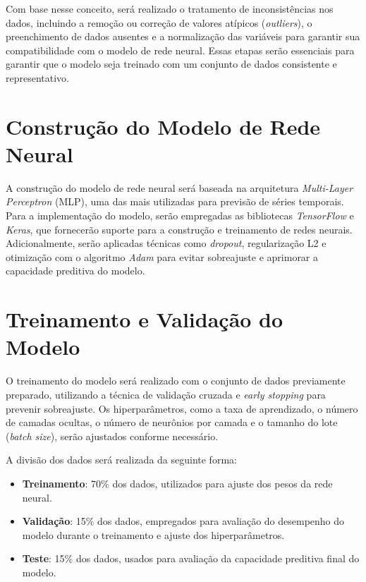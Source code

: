     Com base nesse conceito, será realizado o tratamento de inconsistências nos dados, incluindo a remoção 
    ou correção de valores atípicos (\emph{outliers}), o preenchimento de dados ausentes e a normalização das 
    variáveis para garantir sua compatibilidade com o modelo de rede neural. Essas etapas serão essenciais 
    para garantir que o modelo seja treinado com um conjunto de dados consistente e representativo.

\section{Construção do Modelo de Rede Neural}

    A construção do modelo de rede neural será baseada na arquitetura \emph{Multi-Layer Perceptron} (MLP), 
    uma das mais utilizadas para previsão de séries temporais. Para a implementação do modelo, serão 
    empregadas as bibliotecas \emph{TensorFlow} e \emph{Keras}, que fornecerão suporte para a construção e 
    treinamento de redes neurais. Adicionalmente, serão aplicadas técnicas como \emph{dropout}, 
    regularização L2 e otimização com o algoritmo \emph{Adam} para evitar sobreajuste e aprimorar a 
    capacidade preditiva do modelo.

\section{Treinamento e Validação do Modelo}

    O treinamento do modelo será realizado com o conjunto de dados previamente preparado, utilizando a 
    técnica de validação cruzada e \emph{early stopping} para prevenir sobreajuste. Os hiperparâmetros, 
    como a taxa de aprendizado, o número de camadas ocultas, o número de neurônios por camada e o tamanho 
    do lote (\emph{batch size}), serão ajustados conforme necessário.

    A divisão dos dados será realizada da seguinte forma: 
    \begin{itemize} 
        \item \textbf{Treinamento}: 70\% dos dados, utilizados para ajuste dos pesos da rede neural. 
        \item \textbf{Validação}: 15\% dos dados, empregados para avaliação do desempenho do modelo durante 
        o treinamento e ajuste dos hiperparâmetros. 
        \item \textbf{Teste}: 15\% dos dados, usados para avaliação da capacidade preditiva final do modelo. 
    \end{itemize}

